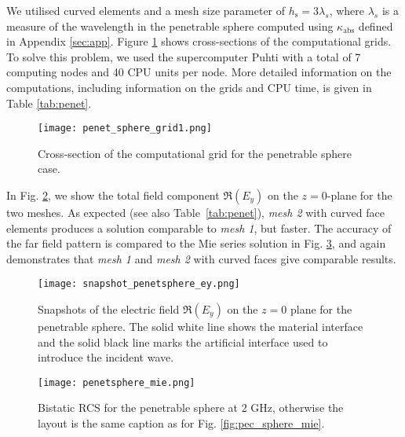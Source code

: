 \documentclass[a4paper,12pt]{article}
\newcommand{\hs}{h_{\mathrm{s}}}
\begin{document}
We utilised curved elements and a mesh size parameter of $\hs=3\lambda_s$, where $\lambda_s$ is a measure of the wavelength in the penetrable sphere computed using $\kappa_{\mathrm{abs}}$ defined in Appendix \ref{sec:app}. Figure \ref{fig:penet_sphere_grid} shows cross-sections of the computational grids.  To solve this problem, we used the supercomputer Puhti with a total of 7 computing nodes and 40 CPU units per node. More detailed information on the computations, including information on the grids and CPU time, is given in Table \ref{tab:penet}.

\begin{figure}[!htb]
    \centering
    \texttt{[image: penet\_sphere\_grid1.png]} 
\caption{Cross-section of the computational grid for the penetrable sphere case. }
    \label{fig:penet_sphere_grid}
\end{figure}

In Fig. \ref{fig:penet_sphere_snap}, we show the total field component $\Re(E_y)$ on the $z=0$-plane for the two meshes. As expected (see also Table~\ref{tab:penet}), \emph{mesh 2} with curved face
elements produces a solution comparable to \emph{mesh 1}, but faster.  The accuracy of the far field pattern is compared to the Mie series solution in Fig. \ref{fig:penet_sphere_mie}, and again demonstrates that \emph{mesh 1} and \emph{mesh 2} with curved faces give comparable results.

\begin{figure}[!htb]
    \centering
    \texttt{[image: snapshot\_penetsphere\_ey.png]}
    \caption{Snapshots of the electric field $\Re(E_y)$ on the $z=0$ plane for the penetrable sphere. The solid white line shows the material interface and the solid black line marks the artificial interface used to introduce the incident wave.}
    \label{fig:penet_sphere_snap}
\end{figure}

\begin{figure}[!htb]
    \centering
    \texttt{[image: penetsphere\_mie.png]} 
\caption{Bistatic RCS for the penetrable sphere at 2 GHz, otherwise the layout is the same caption as for Fig. \ref{fig:pec_sphere_mie}.}
    \label{fig:penet_sphere_mie}
\end{figure}
\end{document}
